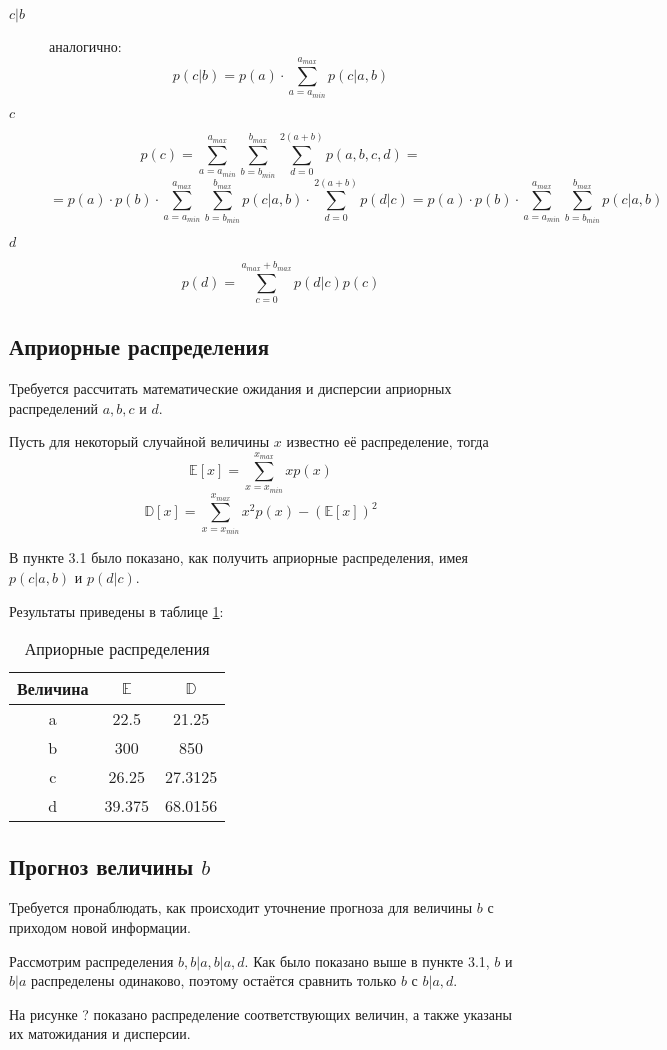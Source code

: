 \documentclass[12pt,a4paper,oneside,fleqn,leqno]{article}
\begin{document}
\begin{description}
				\item[$c|b$] аналогично:
				$$p(c|b) = p(a) \cdot \sum\limits_{a = a_{min}}^{a_{max}} p(c|a, b)$$
				\noindent\makebox[\linewidth]{\rule{\textwidth}{0.4pt}}
				\item[$c$]
				$$p(c) = \sum\limits_{a = a_{min}}^{a_{max}} \sum\limits_{b = b_{min}}^{b_{max}} \sum\limits_{d = 0}^{2(a + b)} p(a, b, c, d) =$$ 
				$$ = p(a) \cdot p(b) \cdot \sum\limits_{a = a_{min}}^{a_{max}} \sum\limits_{b = b_{min}}^{b_{max}} p(c|a,b) \cdot \sum\limits_{d = 0}^{2(a + b)} p(d|c) = p(a)\cdot p(b) \cdot  \sum\limits_{a = a_{min}}^{a_{max}} \sum\limits_{b = b_{min}}^{b_{max}} p(c|a,b)$$
				\noindent\makebox[\linewidth]{\rule{\textwidth}{0.4pt}}
				\item[$d$]
				$$ p(d) = \sum\limits_{c = 0}^{a_{max} + b_{max}}p(d|c)p(c)$$
				\noindent\makebox[\linewidth]{\rule{\textwidth}{0.4pt}}
			\end{description}
		\subsection{Априорные распределения}
			Требуется рассчитать математические ожидания и дисперсии априорных распределений $a, b, c$ и $d$.\par
			Пусть для некоторый случайной величины $x$ известно её распределение, тогда
			$$ \mathbb{E}[x] = \sum_{x = x_{min}}^{x_{max}}xp(x)$$
			$$ \mathbb{D}[x] = \sum_{x = x_{min}}^{x_{max}}x^2p(x) - (\mathbb{E}[x])^2$$\par
			В пункте 3.1 было показано, как получить априорные распределения, имея $p(c|a,b)$ и $p(d|c).$\par
			Результаты приведены в таблице \ref{tab:aprior1}:
			\begin{table}[H]
			\centering
			\begin{tabular}{|c|c|c|}
				\hline
				Величина & $\mathbb{E}$ & $\mathbb{D}$\\
				\hline
				a & 22.5 & 21.25\\
				\hline
				b & 300 & 850\\
				\hline
				c & 26.25 & 27.3125\\
				\hline
				d & 39.375 & 68.0156\\
				\hline
				\end{tabular}
			\caption{Априорные распределения}
			\label{tab:aprior1}
		\end{table}
		\subsection{Прогноз величины $b$}
			Требуется пронаблюдать, как происходит уточнение прогноза для величины $b$ с приходом новой информации.\par
			Рассмотрим распределения $b, b|a, b|a,d$. Как было показано выше в пункте 3.1, $b$ и $b|a$ распределены одинаково, поэтому остаётся сравнить только $b$ с $b|a, d$.\par
			На рисунке ? показано распределение соответствующих величин, а также указаны их матожидания и дисперсии.
\end{document}
